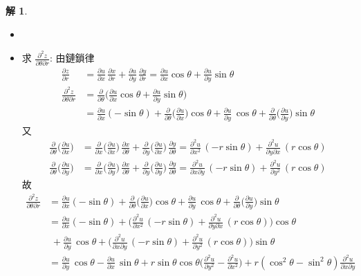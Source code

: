 \documentclass[12pt]{extarticle}
\newcommand{\ds}{\displaystyle}
\theoremstyle{definition}
\newtheorem*{sol}{解}
\newcommand{\pdiff}[2]{\frac{\partial #1}{\partial #2}}
\newcommand{\pdifft}[2]{\frac{\partial^2 #1}{\partial #2^2}}
\begin{document}
\begin{sol} 
  \begin{itemize}\setlength{\itemsep}{0pt}
    \item[]
    \item 求 $\ds\frac{\partial^2 z}{\partial\theta\partial r}$: 由鏈鎖律
  \begin{align*}
    \pdiff{z}{r} &= \pdiff{u}{x}\,\pdiff{x}{r} + \pdiff{u}{y}\,\pdiff{y}{r} = \pdiff{u}{x}\cos\theta + \pdiff{u}{y}\sin\theta \\
    \frac{\partial^2 z}{\partial\theta\partial r} &= \pdiff{}{\theta}\bigg(\pdiff{u}{x}\cos\theta + \pdiff{u}{y}\sin\theta\bigg) \\ &= \pdiff{u}{x}(-\sin\theta) + \pdiff{}{\theta}\bigg(\pdiff{u}{x}\bigg)\cos\theta + \pdiff{u}{y}\,\cos\theta + \pdiff{}{\theta}\bigg(\pdiff{u}{y}\bigg)\sin\theta
  \end{align*}
  又
  \begin{align*}
    \pdiff{}{\theta}\bigg(\pdiff{u}{x}\bigg) &= \pdiff{}{x}\bigg(\pdiff{u}{x}\bigg)\,\pdiff{x}{\theta} + \pdiff{}{y}\bigg(\pdiff{u}{x}\bigg)\,\pdiff{y}{\theta} = \pdifft{u}{x}\,(-r\sin\theta) + \frac{\partial^2 u}{\partial y\partial x}\,(r\cos\theta) \\
    \pdiff{}{\theta}\bigg(\pdiff{u}{y}\bigg) &= \pdiff{}{x}\bigg(\pdiff{u}{y}\bigg)\,\pdiff{x}{\theta} + \pdiff{}{y}\bigg(\pdiff{u}{y}\bigg)\,\pdiff{y}{\theta} = \frac{\partial^2 u}{\partial x\partial y}\,(-r\sin\theta) + \pdifft{u}{y}\,(r\cos\theta)
  \end{align*}
  故
  \begin{align*}
    \frac{\partial^2 z}{\partial\theta\partial r} &= \pdiff{u}{x}(-\sin\theta) + \pdiff{}{\theta}\bigg(\pdiff{u}{x}\bigg)\cos\theta + \pdiff{u}{y}\,\cos\theta + \pdiff{}{\theta}\bigg(\pdiff{u}{y}\bigg)\sin\theta \\
    &= \pdiff{u}{x}(-\sin\theta) + \bigg(\pdifft{u}{x}\,(-r\sin\theta) + \frac{\partial^2 u}{\partial y\partial x}\,(r\cos\theta)\bigg)\cos\theta \\ &\;+ \pdiff{u}{y}\,\cos\theta + \bigg(\frac{\partial^2 u}{\partial x\partial y}\,(-r\sin\theta) + \pdifft{u}{y}\,(r\cos\theta)\bigg)\sin\theta \\
    &= \pdiff{u}{y}\,\cos\theta - \pdiff{u}{x}\,\sin\theta + r\sin\theta\cos\theta\bigg(\pdifft{u}{y} - \pdifft{u}{x}\bigg) + r(\cos^2\theta - \sin^2\theta)\frac{\partial^2 u}{\partial x\partial y}
  \end{align*}
  

\end{itemize}
\end{sol}
\end{document}

